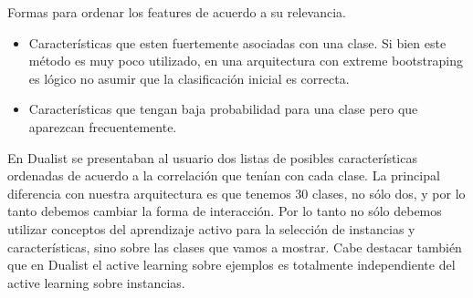 





Formas para ordenar los features de acuerdo a su relevancia.
\begin{itemize}
	\item Características que esten fuertemente asociadas con una clase. Si bien este método es muy poco utilizado, en una arquitectura con extreme bootstraping es lógico no asumir que la clasificación inicial es correcta.
	\item Características que tengan baja probabilidad para una clase pero que
	aparezcan frecuentemente.
\end{itemize}

En Dualist se presentaban al usuario dos listas de posibles características ordenadas de acuerdo a la correlación que tenían con cada clase. La principal diferencia con nuestra arquitectura es que tenemos 30 clases, no sólo dos, y por lo tanto debemos cambiar la forma de interacción. Por lo tanto no sólo debemos utilizar conceptos del aprendizaje activo para la selección de instancias y características, sino sobre las clases que vamos a mostrar. Cabe destacar también que en Dualist el active learning sobre ejemplos es totalmente independiente
del active learning sobre instancias.

